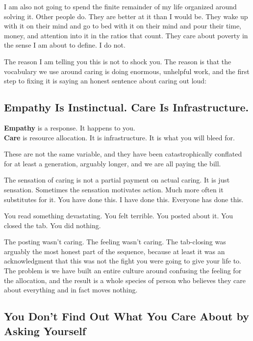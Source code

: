 \documentclass[11pt, letterpaper]{article}
\newcommand{\vocab}[1]{\textbf{\textcolor{meatred}{#1}}}
\begin{document}
I am also not going to spend the finite remainder of my life organized around solving it. Other people do. They are better at it than I would be. They wake up with it on their mind and go to bed with it on their mind and pour their time, money, and attention into it in the ratios that count. They care about poverty in the sense I am about to define. I do not.

The reason I am telling you this is not to shock you. The reason is that the vocabulary we use around caring is doing enormous, unhelpful work, and the first step to fixing it is saying an honest sentence about caring out loud:

\subsection{Empathy Is Instinctual. Care Is Infrastructure.}

\begin{notebox}
\vocab{Empathy} is a response. It happens to you.\\[0.3em]
\vocab{Care} is resource allocation. It is infrastructure. It is what you will bleed for.
\end{notebox}

These are not the same variable, and they have been catastrophically conflated for at least a generation, arguably longer, and we are all paying the bill.

The sensation of caring is not a partial payment on actual caring. It is just sensation. Sometimes the sensation motivates action. Much more often it substitutes for it. You have done this. I have done this. Everyone has done this.

You read something devastating. You felt terrible. You posted about it. You closed the tab. You did nothing.

The posting wasn't caring. The feeling wasn't caring. The tab-closing was arguably the most honest part of the sequence, because at least it was an acknowledgment that this was not the fight you were going to give your life to. The problem is we have built an entire culture around confusing the feeling for the allocation, and the result is a whole species of person who believes they care about everything and in fact moves nothing.

\subsection{You Don't Find Out What You Care About by Asking Yourself}
\end{document}
